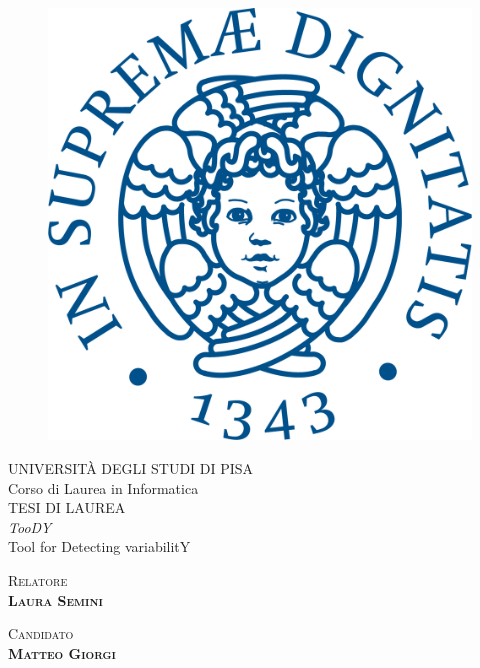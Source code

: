 \documentclass[12pt]{report}
\newcommand{\toody}{\textsl{TooDY}\xspace}
\begin{document}
\fontsize{13}{18}\selectfont


\begin{titlepage}
\begin{figure}
\centering\includegraphics[scale=0.5]{cherubino.png}
\vspace{0.5cm}
\end{figure}
\begin{center}
{\large{UNIVERSITÀ DEGLI STUDI DI PISA}}\\
\vspace{0.5cm}
{\LARGE{Corso di Laurea in Informatica}}\\
\vspace{2cm}
{\Large{TESI DI LAUREA}}\\
\vspace{2cm}
{\huge{\toody\\{\normalsize Tool for Detecting variabilitY}}}
\end{center}
\vspace{2cm}
\begin{minipage}[t]{0.49\textwidth}\centering
{\large{\scshape{Relatore}\\\bf{Laura Semini}}}
\end{minipage}
\hfill
\begin{minipage}[t]{0.49\textwidth}\centering
{\large{\scshape{Candidato}\\\bf{Matteo Giorgi}}}
\vspace{4cm}
\end{minipage}
\end{titlepage}
\end{document}
